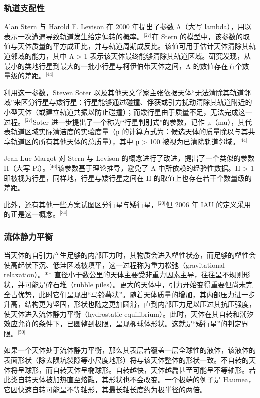 \subsubsection{轨道支配性}
Alan Stern 与 Harold F. Levison 在 2000 年提出了参数 Λ（大写 lambda），用以表示一次遭遇导致轨道发生给定偏转的概率。\(^\text{[27]}\)在 Stern 的模型中，该参数的取值与天体质量的平方成正比，并与轨道周期成反比。该值可用于估计天体清除其轨道邻域的能力，其中  Λ > 1 表示该天体最终能够清除其轨道区域。研究发现，从最小的类地行星到最大的一批小行星与柯伊伯带天体之间，Λ 的数值存在五个数量级的差距。\(^\text{[44]}\)

利用这一参数，Steven Soter 以及其他天文学家主张依据天体“无法清除其轨道邻域”来区分行星与矮行星：行星能够通过碰撞、俘获或引力扰动清除其轨道附近的小型天体（或建立轨道共振以防止碰撞）；而矮行星由于质量不足，无法完成这一过程。\(^\text{[27]}\)Soter 进一步提出了一个称为“行星判别式”的参数，记作 µ（mu），其代表轨道区域实际清洁度的实验度量（µ 的计算方式为：候选天体的质量除以与其共享轨道区的所有其他天体的总质量），其中  µ > 100 被视为已清除轨道邻域。\(^\text{[44]}\)

Jean-Luc Margot 对 Stern 与 Levison 的概念进行了改进，提出了一个类似的参数 Π（大写 Pi）。\(^\text{[46]}\)该参数基于理论推导，避免了 Λ 中所依赖的经验性数据。Π > 1 即被视为行星，同样地，行星与矮行星之间在 Π 的取值上也存在若干个数量级的差距。

此外，还有其他一些方案试图区分行星与矮行星，\(^\text{[20]}\)但 2006 年 IAU 的定义采用的正是这一概念。\(^\text{[34]}\)
\subsubsection{流体静力平衡}
当天体的自引力产生足够的内部压力时，其物质会进入塑性状态，而足够的塑性会使高起伏下沉、低洼区域被填平，这一过程称为重力松弛（gravitational relaxation）。**
直径小于数公里的天体主要受非重力因素主导，往往呈不规则形状，并可能是碎石堆（rubble piles）。更大的天体中，引力开始变得重要但尚未完全占优势，此时它们呈现出“马铃薯状”。随着天体质量的增加，其内部压力进一步升高，结构更为坚固，形状也随之更加圆滑，直到内部压力足以压过其抗压强度，使天体进入流体静力平衡（hydrostatic equilibrium）。此时，天体在其自转和潮汐效应允许的条件下，已圆整到极限，呈现椭球体形状。这就是“矮行星”的判定界限。\(^\text{[50]}\)

如果一个天体处于流体静力平衡，那么其表层若覆盖一层全球性的液体，该液体的表面形状（除去陨坑裂隙等小尺度地形）将与该天体整体的形状一致。不自转的天体将呈球形，而自转天体呈椭球形。自转越快，天体越扁甚至可能呈不等轴形。若此类自转天体被加热直至熔融，其形状也不会改变。一个极端的例子是 Haumea，它因快速自转可能呈不等轴形，其最长轴长度约为极半径的两倍。

